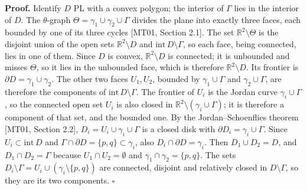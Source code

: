 \documentclass[
  11pt,
]{article}
\begin{document}
\textbf{Proof.} Identify \(D\) PL with a convex polygon; the interior of
\(\Gamma\) lies in the interior of \(D\). The \(\theta\)-graph
\(\Theta=\gamma_1\cup\gamma_2\cup\Gamma\) divides the plane into exactly
three faces, each bounded by one of its three cycles {[}MT01, Section
2.1{]}. The set \(\mathbb R^2\setminus\Theta\) is the disjoint union of
the open sets \(\mathbb R^2\setminus D\) and
\(\mathrm{int}\,D\setminus\Gamma\), so each face, being connected, lies
in one of them. Since \(D\) is convex, \(\mathbb R^2\setminus D\) is
connected; it is unbounded and misses \(\Theta\), so it lies in the
unbounded face, which is therefore \(\mathbb R^2\setminus D\). Its
frontier is \(\partial D=\gamma_1\cup\gamma_2\). The other two faces
\(U_1,U_2\), bounded by \(\gamma_1\cup\Gamma\) and
\(\gamma_2\cup\Gamma\), are therefore the components of
\(\mathrm{int}\,D\setminus\Gamma\). The frontier of \(U_i\) is the
Jordan curve \(\gamma_i\cup\Gamma\), so the connected open set \(U_i\)
is also closed in \(\mathbb R^2\setminus(\gamma_i\cup\Gamma)\); it is
therefore a component of that set, and the bounded one. By the
Jordan--Schoenflies theorem {[}MT01, Section 2.2{]},
\(D_i=U_i\cup\gamma_i\cup\Gamma\) is a closed disk with
\(\partial D_i=\gamma_i\cup\Gamma\). Since \(U_i\subset\mathrm{int}\,D\)
and \(\Gamma\cap\partial D=\{p,q\}\subset\gamma_i\), also
\(D_i\cap\partial D=\gamma_i\). Then \(D_1\cup D_2=D\), and
\(D_1\cap D_2=\Gamma\) because \(U_1\cap U_2=\emptyset\) and
\(\gamma_1\cap\gamma_2=\{p,q\}\). The sets
\(D_i\setminus\Gamma=U_i\cup(\gamma_i\setminus\{p,q\})\) are connected,
disjoint and relatively closed in \(D\setminus\Gamma\), so they are its
two components. \(\square\)
\end{document}
